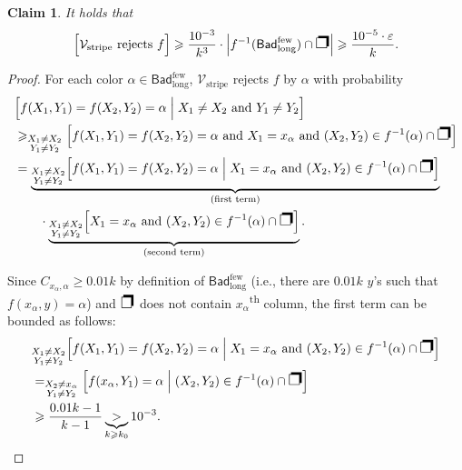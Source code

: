 \documentclass[11pt,fleqn]{article}
\renewcommand{\geq}{\geqslant}
\renewcommand{\epsilon}{\varepsilon}
\newcommand{\nth}[1]{#1\textsuperscript{th}\xspace}
\newcommand{\V}{\calV}
\newcommand{\f}{f}
\newcommand{\Vstripe}{\V_\mathrm{stripe}}
\newcommand{\Bad}{\mathsf{Bad}}
\newcommand{\Badlss}{\Bad^\mathrm{few}}
\newcommand{\BadlssL}{\Badlss_\mathrm{long}}
\newcommand{\SQ}{\text{{\Large\ding{112}}}}
\newcommand{\calV}{\mathcal{V}}
\let\Pr\relax\DeclareMathOperator*{\Pr}{\mathbb{P}}
\newtheorem{claim}[theorem]{Claim}
\theoremstyle{definition}
\numberwithin{equation}{section}
\begin{document}
\begin{claim}
\label{clm:Cut-hard:stripe:far:2221}
It holds that
\begin{align}
    \Pr\Bigl[ \Vstripe \text{ rejects } \f \Bigr]
    \geq \frac{10^{-3}}{k^3} \cdot \Bigl|\f^{-1}(\BadlssL) \cap \SQ\Bigr|
    \geq \frac{10^{-5} \cdot \epsilon}{k}.
\end{align}
\end{claim}
\begin{proof}
For each color $\alpha \in \BadlssL$,
$\Vstripe$ rejects $\f$ by $\alpha$ with probability
\begin{align}
\begin{aligned}
    & \Pr\Bigl[
        \f(X_1,Y_1) = \f(X_2,Y_2) = \alpha \Bigm| X_1 \neq X_2 \text{ and } Y_1 \neq Y_2
    \Bigr] \\
    & \geq \Pr_{\substack{X_1 \neq X_2 \\ Y_1 \neq Y_2}}\Bigl[
        \f(X_1,Y_1) = \f(X_2,Y_2) = \alpha \text{ and }
        X_1 = x_\alpha \text{ and }
        (X_2,Y_2) \in \f^{-1}(\alpha) \cap \SQ
    \Bigr] \\
    & = \underbrace{\Pr_{\substack{X_1 \neq X_2 \\ Y_1 \neq Y_2}}\Bigl[
        \f(X_1,Y_1) = \f(X_2,Y_2) = \alpha \Bigm|
        X_1 = x_\alpha \text{ and }
        (X_2,Y_2) \in \f^{-1}(\alpha) \cap \SQ
    \Bigr]}_{\text{(first term)}} \\
    & \qquad \cdot \underbrace{\Pr_{\substack{X_1 \neq X_2 \\ Y_1 \neq Y_2}}\Bigl[
        X_1 = x_\alpha \text{ and }
        (X_2,Y_2) \in \f^{-1}(\alpha) \cap \SQ
    \Bigr]}_{\text{(second term)}}.
\end{aligned}
\end{align}

Since $C_{x_\alpha,\alpha} \geq 0.01k$ by definition of $\BadlssL$
(i.e., there are $0.01k$ $y$'s such that $\f(x_\alpha, y) = \alpha$)
and $\SQ$ does not contain \nth{$x_\alpha$} column,
the first term can be bounded as follows:
\begin{align}
\begin{aligned}
    & \Pr_{\substack{X_1 \neq X_2 \\ Y_1 \neq Y_2}}\Bigl[
        \f(X_1,Y_1) = \f(X_2,Y_2) = \alpha \Bigm|
        X_1 = x_\alpha \text{ and }
        (X_2,Y_2) \in \f^{-1}(\alpha) \cap \SQ
    \Bigr] \\
    & = \Pr_{\substack{X_2 \neq x_\alpha \\ Y_1 \neq Y_2}}\Bigl[
        \f(x_\alpha,Y_1) = \alpha \Bigm|
        (X_2,Y_2) \in \f^{-1}(\alpha) \cap \SQ
    \Bigr] \\
    & \geq \frac{0.01k-1}{k-1}
    \underbrace{>}_{k \geq k_0} 10^{-3}.
\end{aligned}
\end{align}


\end{proof}
\end{document}
